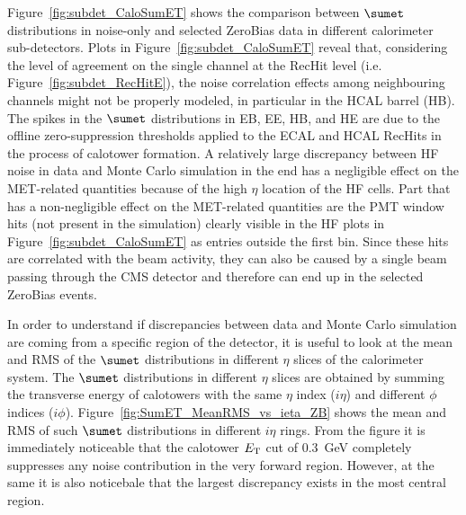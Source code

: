Figure~\ref{fig:subdet_CaloSumET} shows the comparison between $\sumet$ distributions in noise-only
and selected ZeroBias data in different calorimeter sub-detectors. Plots in Figure~\ref{fig:subdet_CaloSumET} reveal that, 
considering the level of agreement on the single channel at the RecHit level (i.e. Figure~\ref{fig:subdet_RecHitE}), 
the noise correlation effects among neighbouring channels might 
not be properly modeled, in particular in the HCAL barrel (HB). 
The spikes in the $\sumet$ distributions in EB, EE, HB, and HE are due to the offline zero-suppression
thresholds applied to the ECAL and HCAL RecHits in the process of calotower formation. A relatively large discrepancy between HF noise in data and
Monte Carlo simulation in the end has a negligible effect on the MET-related quantities 
because of the high $\eta$ location of the HF cells. Part that has a non-negligible effect on the MET-related quantities are the PMT window hits
(not present in the simulation) clearly visible in the HF plots in Figure~\ref{fig:subdet_CaloSumET} as entries outside the first bin. Since these
hits are correlated with the beam activity, they can also be caused by a single beam passing through the CMS detector and therefore can end up
in the selected ZeroBias events.

In order to understand if discrepancies between data and Monte Carlo simulation are coming from a specific region of the detector, it is useful to
look at the mean and RMS of the $\sumet$ distributions in different $\eta$ slices of the calorimeter system. The $\sumet$ distributions in different
$\eta$ slices are obtained
by summing the transverse energy of calotowers with the same $\eta$ index ($i\eta$) and different $\phi$ indices ($i\phi$).
Figure~\ref{fig:SumET_MeanRMS_vs_ieta_ZB} shows the mean and RMS of such $\sumet$ distributions in different $i\eta$ rings. From the figure it is
immediately noticeable that the calotower $E_{\rm T}$ cut of $0.3$~GeV completely suppresses any noise contribution in the very forward region.
However, at the same it is also noticebale that the largest discrepancy exists in the most central region.


